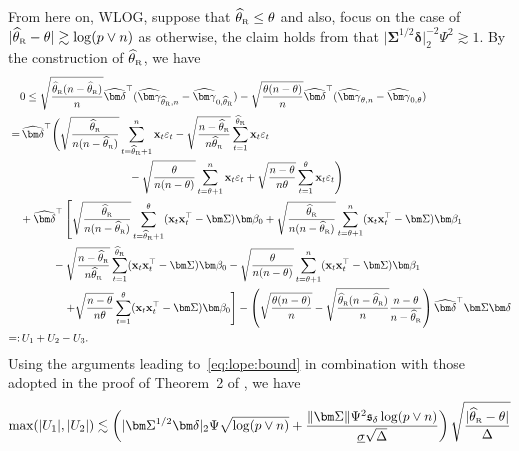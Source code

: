 \documentclass[11pt, a4paper]{article}
\newcommand{\mbf}{\mathbf}
\newcommand{\vep}{\varepsilon}
\renewcommand{\l}{\left}
\renewcommand{\r}{\right}
\def\wh{\widehat}
\newcommand{\cp}{\theta}
\newcommand{\Rf}{\text{\tiny \upshape R}} %
\theoremstyle{definition}
\theoremstyle{definition}
\theoremstyle{definition}
\theoremstyle{definition}
\theoremstyle{definition}
\theoremstyle{remark}
\theoremstyle{definition}
\theoremstyle{definition}
\theoremstyle{definition}
\begin{document}
From here on, WLOG, suppose that $\wh{\cp}_{\Rf} \le \cp$ and also, focus on the case of $\vert \wh{\cp}_{\Rf} - \cp \vert \gtrsim \log(p \vee n)$ as otherwise, the claim holds from that $\vert \bm\Sigma^{1/2} \bm\delta \vert_2^{-2} \Psi^2 \gtrsim 1$.
By the construction of $\wh\cp_{\Rf}$, we have
\begin{align*}
& 0 \le \sqrt{\frac{\wh{\cp}_{\Rf}(n - \wh{\cp}_{\Rf})}{n}} \wh{\bm\delta}^\top ( \wh{\bm\gamma}_{\wh{\cp}_{\Rf}, n} - \wh{\bm\gamma}_{0, \wh{\cp}_{\Rf}} ) - \sqrt{\frac{\cp(n - \cp)}{n}} \wh{\bm\delta}^\top ( \wh{\bm\gamma}_{\cp, n} - \wh{\bm\gamma}_{0, \cp} )
\\
= &\, \wh{\bm\delta}^\top \Biggl( \sqrt{\frac{\wh{\cp}_{\Rf}}{n(n - \wh{\cp}_{\Rf})}} \sum_{t = \wh{\cp}_{\Rf} + 1}^n \mbf x_t \vep_t - \sqrt{\frac{n - \wh{\cp}_{\Rf}}{n\wh{\cp}_{\Rf}}} \sum_{t = 1}^{\wh{\cp}_{\Rf}} \mbf x_t \vep_t 
\\
& \qquad \qquad \qquad \qquad \qquad  - \sqrt{\frac{\cp}{n(n - \cp)}} \sum_{t = \cp + 1}^n \mbf x_t \vep_t + \sqrt{\frac{n - \cp}{n\cp}} \sum_{t = 1}^{\cp} \mbf x_t \vep_t \Biggr) 
\\
& + \wh{\bm\delta}^\top \l[ \sqrt{\frac{\wh{\cp}_{\Rf}}{n(n - \wh{\cp}_{\Rf})}} \sum_{t = \wh{\cp}_{\Rf} + 1}^{\cp} (\mbf x_t \mbf x_t^\top - \bm\Sigma) \bm\beta_0 + \sqrt{\frac{\wh{\cp}_{\Rf}}{n(n - \wh{\cp}_{\Rf})}} \sum_{t = \cp + 1}^{n} (\mbf x_t \mbf x_t^\top - \bm\Sigma) \bm\beta_1 \r.
\\
& \quad \quad \quad - \sqrt{\frac{n - \wh{\cp}_{\Rf}}{n\wh{\cp}_{\Rf}}} \sum_{t = 1}^{\wh{\cp}_{\Rf}} (\mbf x_t \mbf x_t^\top - \bm\Sigma) \bm\beta_0 - \sqrt{\frac{\cp}{n(n - \cp)}} \sum_{t = \cp + 1}^n (\mbf x_t \mbf x_t^\top - \bm\Sigma) \bm\beta_1 
\\
& \qquad \qquad \l. + \sqrt{\frac{n - \cp}{n\cp}} \sum_{t = 1}^{\cp} (\mbf x_t \mbf x_t^\top - \bm\Sigma) \bm\beta_0 \r]
- \l( \sqrt{\frac{\cp (n - \cp)}{n}} - \sqrt{\frac{\wh{\cp}_{\Rf} (n - \wh{\cp}_{\Rf})}{n}} \frac{n - \cp}{n - \wh{\cp}_{\Rf}} \r) \wh{\bm\delta}^\top \bm\Sigma \bm\delta 
\\
=: & \, U_1 + U_2 - U_3.
\end{align*}
Using the arguments leading to~\eqref{eq:lope:bound} in combination with those adopted in the proof of Theorem~2 of \cite{cho2024detection}, we have
\begin{align*}
\max(\vert U_1 \vert, \vert U_2 \vert) \lesssim 
\l( \vert \bm\Sigma^{1/2} \bm\delta \vert_2 \Psi \sqrt{\log(p \vee n)} + \frac{\Vert \bm\Sigma \Vert \Psi^2 \mathfrak{s}_\delta \log(p \vee n)}{\underline{\sigma}\sqrt{\Delta}} \r)
\sqrt{\frac{\vert \wh{\cp}_{\Rf} - \cp \vert}{\Delta}}
\end{align*}
\end{document}
